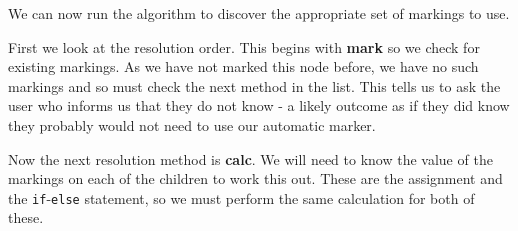 \documentclass[twoside,a4paper]{report}
\begin{document}


We can now run the algorithm to discover the appropriate set of markings to use.

First we look at the resolution order. This begins with \textbf{mark} so we check for existing markings. As we have not marked this node before,
we have no such markings and so must check the next method in the list. This tells us to ask the user who informs us that they do not know -
a likely outcome as if they did know they probably would not need to use our automatic marker.

Now the next resolution method is \textbf{calc}. We will need to know the value of the markings on each of the children to work this out. These
are the assignment and the \texttt{if}-\texttt{else} statement, so we must perform the same calculation for both of these.
\end{document}
